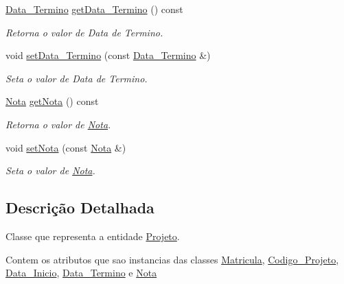 \begin{DoxyCompactItemize}
\hyperlink{class_data___termino}{\-Data\-\_\-\-Termino} \hyperlink{class_projeto_ae29e37b6730fc277a460d864238df94b}{get\-Data\-\_\-\-Termino} () const 
\begin{DoxyCompactList}\small\item\em \-Retorna o valor de \-Data de \-Termino. \end{DoxyCompactList}\item 
void \hyperlink{class_projeto_a5371af0d47b30cb46fcd02a4d5fde73f}{set\-Data\-\_\-\-Termino} (const \hyperlink{class_data___termino}{\-Data\-\_\-\-Termino} \&)
\begin{DoxyCompactList}\small\item\em \-Seta o valor de \-Data de \-Termino. \end{DoxyCompactList}\item 
\hyperlink{class_nota}{\-Nota} \hyperlink{class_projeto_add8f77d42d9c5656456b7625f00c2c02}{get\-Nota} () const 
\begin{DoxyCompactList}\small\item\em \-Retorna o valor de \hyperlink{class_nota}{\-Nota}. \end{DoxyCompactList}\item 
void \hyperlink{class_projeto_ad074101c3df39dea6c3569c75593f338}{set\-Nota} (const \hyperlink{class_nota}{\-Nota} \&)
\begin{DoxyCompactList}\small\item\em \-Seta o valor de \hyperlink{class_nota}{\-Nota}. \end{DoxyCompactList}\end{DoxyCompactItemize}


\subsection{\-Descrição \-Detalhada}
\-Classe que representa a entidade \hyperlink{class_projeto}{\-Projeto}. 

\-Contem os atributos que sao instancias das classes \hyperlink{class_matricula}{\-Matricula}, \hyperlink{class_codigo___projeto}{\-Codigo\-\_\-\-Projeto}, \hyperlink{class_data___inicio}{\-Data\-\_\-\-Inicio}, \hyperlink{class_data___termino}{\-Data\-\_\-\-Termino} e \hyperlink{class_nota}{\-Nota} 

